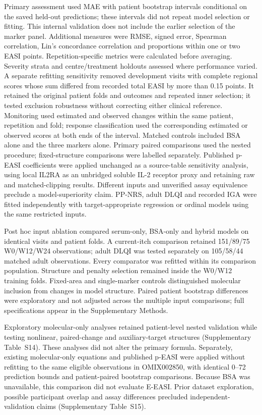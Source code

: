Primary assessment used MAE with patient bootstrap intervals conditional on the saved held-out predictions; these intervals did not repeat model selection or fitting. This internal validation does not include the earlier selection of the marker panel. Additional measures were RMSE, signed error, Spearman correlation, Lin's concordance correlation and proportions within one or two EASI points. Repetition-specific metrics were calculated before averaging. Severity strata and centre/treatment holdouts assessed where performance varied. A separate refitting sensitivity removed development visits with complete regional scores whose sum differed from recorded total EASI by more than 0.15 points. It retained the original patient folds and outcomes and repeated inner selection; it tested exclusion robustness without correcting either clinical reference. Monitoring used estimated and observed changes within the same patient, repetition and fold; response classification used the corresponding estimated or observed scores at both ends of the interval. Matched controls included BSA alone and the three markers alone. Primary paired comparisons used the nested procedure; fixed-structure comparisons were labelled separately. Published p-EASI coefficients were applied unchanged as a source-table sensitivity analysis, using local IL2RA as an unbridged soluble IL-2 receptor proxy and retaining raw and matched-clipping results. Different inputs and unverified assay equivalence preclude a model-superiority claim.\citep{thijs2017,thijs2019,bakker2020} PP-NRS, adult DLQI and recorded IGA were fitted independently with target-appropriate regression or ordinal models using the same restricted inputs.

Post hoc input ablation compared serum-only, BSA-only and hybrid models on identical visits and patient folds. A current-itch comparison retained 151/89/75 W0/W12/W24 observations; adult DLQI was tested separately on 105/58/44 matched adult observations. Every comparator was refitted within its comparison population. Structure and penalty selection remained inside the W0/W12 training folds. Fixed-area and single-marker controls distinguished molecular inclusion from changes in model structure. Paired patient bootstrap differences were exploratory and not adjusted across the multiple input comparisons; full specifications appear in the Supplementary Methods.

Exploratory molecular-only analyses retained patient-level nested validation while testing nonlinear, paired-change and auxiliary-target structures (Supplementary Table~S14). These analyses did not alter the primary formula. Separately, existing molecular-only equations and published p-EASI were applied without refitting to the same eligible observations in OMIX002850, with identical 0--72 prediction bounds and patient-paired bootstrap comparisons. Because BSA was unavailable, this comparison did not evaluate E-EASI. Prior dataset exploration, possible participant overlap and assay differences precluded independent-validation claims (Supplementary Table~S15).

